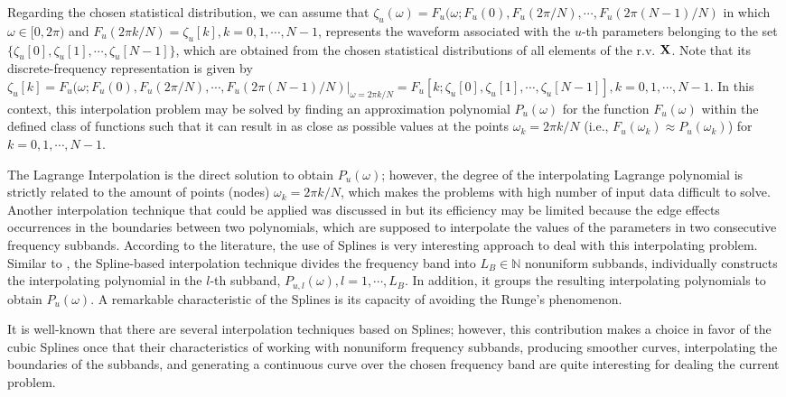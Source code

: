 Regarding the chosen statistical distribution, we can assume that $\zeta_u (\omega) = F_u(\omega; F_u(0), F_u(2\pi/N), \cdots, F_u(2\pi (N-1)/N)$ in which $\omega \in [0,2\pi)$ and $F_u(2\pi k/N) = \zeta_{u}[k], k=0,1,\cdots,N-1$, represents the waveform associated with the $u$-th parameters belonging to the set $\{\zeta_{u}[0], \zeta_{u}[1], \cdots, \zeta_{u}[N-1] \}$, which are obtained from the chosen statistical distributions of all elements of the \ac{r.v.} $\bf X$. Note that its discrete-frequency representation is given by $\zeta_{u}[k] = F_u(\omega; F_u(0), F_u(2\pi/N), \cdots, F_u(2\pi (N-1)/N)|_{\omega=2\pi k/N}=F_u[k; \zeta_{u}[0], \zeta_{u}[1], \cdots, \zeta_{u}[N-1]],k=0,1,\cdots,N-1$. In this context, this interpolation problem may be solved by finding an approximation polynomial $P_u(\omega)$ for the function $F_u(\omega)$ within the defined class of functions such that it can result in as close as possible values at the points $\omega_k = 2\pi k/N$ (i.e., $F_u(\omega_k)\approx P_u(\omega_k)$) for $k=0,1,\cdots,N-1$. 

The Lagrange Interpolation is the direct solution to obtain $P_u(\omega)$; however, the degree of the interpolating Lagrange polynomial is strictly related to the amount of points (nodes)  $\omega_k = 2\pi k/N$, which makes the problems with high number of input data difficult to solve. Another interpolation technique that could be applied was discussed in \cite{Luis:AI,Luis:doc} but its efficiency may be limited because the edge effects occurrences in the boundaries between two polynomials, which are supposed to interpolate the values of the parameters in two consecutive frequency subbands. 
According to the literature, the use of Splines is very interesting approach to deal with this interpolating problem. Similar to \cite{Luis:AI,Luis:doc}, the Spline-based interpolation technique divides the frequency band into $L_B \in \mathbb{N}$ nonuniform subbands, individually constructs the interpolating polynomial in the $l$-th subband, $P_{u,l}(\omega),l=1,\cdots,L_B$. In addition, it groups the resulting interpolating polynomials to obtain $P_u(\omega)$. A remarkable characteristic of the Splines is its capacity of avoiding the Runge's phenomenon. 

It is well-known that there are several interpolation techniques based on Splines; however, this contribution makes a choice in favor of the cubic Splines \cite{Spline} once that their characteristics of working with nonuniform frequency subbands, producing smoother curves, interpolating the boundaries of the subbands, and generating a continuous curve over the chosen frequency band are quite interesting for dealing the current problem. 

